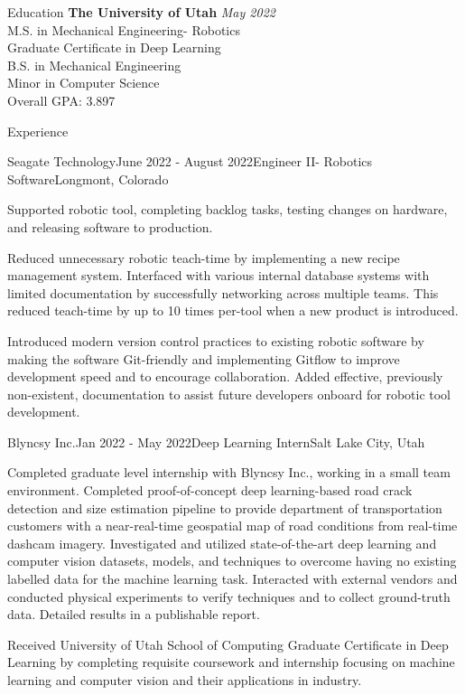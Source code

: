 \documentclass{resume}
\begin{document}
  \begin{rSection}{Education}
    {\bf The University of Utah} \hfill {\em May 2022} \\ 
    { M.S. in Mechanical Engineering- Robotics } \\
    {Graduate Certificate in Deep Learning} \\
    { B.S. in Mechanical Engineering } \\
    { Minor in Computer Science } \smallskip \\
    Overall GPA: 3.897 
  \end{rSection}
  
  \begin{rSection}{Experience}

    \begin{rSubsection}{Seagate Technology}{June 2022 - August 2022}{Engineer II- Robotics Software}{Longmont, Colorado}
    \item Supported robotic tool, completing backlog tasks, testing changes on hardware, and releasing software to production. 
    \item Reduced unnecessary robotic teach-time by implementing a new recipe management system. Interfaced with various internal database systems with limited documentation by successfully networking across multiple teams. This reduced teach-time by up to 10 times per-tool when a new product is introduced.
    \item Introduced modern version control practices to existing robotic software by making the software Git-friendly and implementing Gitflow to improve development speed and to encourage collaboration. Added effective, previously non-existent, documentation to assist future developers onboard for robotic tool development.
    \end{rSubsection}

    \begin{rSubsection}{Blyncsy Inc.}{Jan 2022 - May 2022}{Deep Learning Intern}{Salt Lake City, Utah}
    \item Completed graduate level internship with Blyncsy Inc., working in a small team environment. Completed proof-of-concept deep learning-based road crack detection and size estimation pipeline to provide department of transportation customers with a near-real-time geospatial map of road conditions from real-time dashcam imagery. Investigated and utilized state-of-the-art deep learning and computer vision datasets, models, and techniques to overcome having no existing labelled data for the machine learning task. Interacted with external vendors and conducted physical experiments to verify techniques and to collect ground-truth data. Detailed results in a publishable report.
    \item Received University of Utah School of Computing Graduate Certificate in Deep Learning by completing requisite coursework and internship focusing on machine learning and computer vision and their applications in industry.
    \end{rSubsection}
  

\end{rSection}
\end{document}
